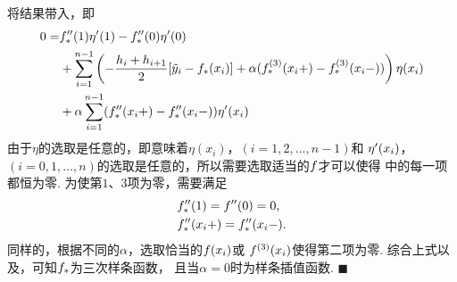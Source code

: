     将结果带入，即
    \begin{equation}\begin{split}
      \label{equ: 正则化证明3}
      0 =&
      \mathnormal{f}_*^{\prime\prime}(1)\eta^\prime(1) - \mathnormal{f}_*^{\prime\prime}(0)\eta^\prime(0)\\
      &+\sum_{i=1}^{n-1} \left(
        -\frac{h_i+h_{i+1}}{2}[\tilde{y}_i - \mathnormal{f}_*(x_i)]
        + \alpha(\mathnormal{f}_*^{(3)}(x_i+) - \mathnormal{f}_*^{(3)}(x_i-))
      \right)\eta(x_i) \\
      &+\alpha\sum_{i=1}^{n-1} ( \mathnormal{f}_*^{\prime\prime}(x_i+) - \mathnormal{f}_*^{\prime\prime}(x_i-))\eta^\prime(x_i)
    \end{split}\end{equation}
    由于$\eta$的选取是任意的，即意味着$\eta(x_i)$，$(i=1,2,\dots,n-1)$和
    $\eta^\prime(x_i)$，$(i=0,1,\dots,n)$的选取是任意的，所以需要选取适当的$\mathnormal{f}$才可以使得
    中的每一项都恒为零. 为使第$1$、$3$项为零，需要满足
    \[\begin{split}
      & \mathnormal{f}_*^{\prime\prime}(1) = \mathnormal{f}^{\prime\prime}(0) = 0,\\
      & \mathnormal{f}_*^{\prime\prime}(x_i+) = \mathnormal{f}_*^{\prime\prime}(x_i-).
    \end{split}\]
    同样的，根据不同的$\alpha$，选取恰当的$\mathnormal{f}(x_i)$或
    $\mathnormal{f}^{(3)}(x_i)$使得第二项为零.
    综合上式以及，可知$\mathnormal{f}_*$为三次样条函数，
    且当$\alpha=0$时为样条插值函数. $\blacksquare$
